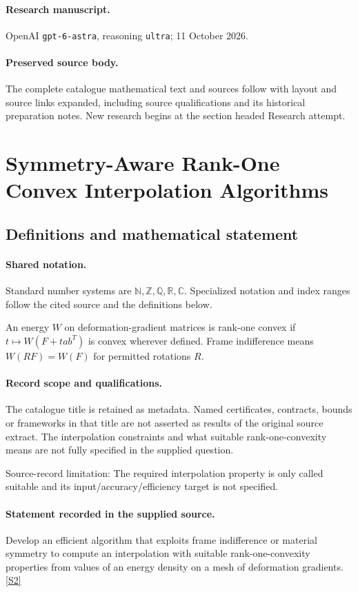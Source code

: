 \documentclass[11pt]{article}
\begin{document}
\paragraph{Research manuscript.} OpenAI \texttt{gpt-6-astra}, reasoning \texttt{ultra}; 11 October 2026.
\paragraph{Preserved source body.} The complete catalogue mathematical text and sources follow with layout and source links expanded, including source qualifications and its historical preparation notes. New research begins at the section headed Research attempt.

\section{Symmetry-Aware Rank-One Convex Interpolation Algorithms}\label{statement}

\subsection{Definitions and mathematical statement}

\paragraph{Shared notation.}Standard number systems are $\mathbb N,\mathbb Z,\mathbb Q,\mathbb R,\mathbb C$. Specialized notation and index ranges follow the cited source and the definitions below.


An energy $W$ on deformation-gradient matrices is rank-one convex if $t\mapsto W(F+t ab^T)$ is convex wherever defined. Frame indifference means $W(RF)=W(F)$ for permitted rotations $R$.
\paragraph{Record scope and qualifications.}
The catalogue title is retained as metadata. Named certificates, contracts, bounds or frameworks in that title are not asserted as results of the original source extract.
The interpolation constraints and what suitable rank-one-convexity means are not fully specified in the supplied question.

Source-record limitation: The required interpolation property is only called suitable and its input/accuracy/efficiency target is not specified.
\paragraph{Statement recorded in the supplied source.}
Develop an efficient algorithm that exploits frame indifference or material symmetry to compute an interpolation with suitable rank-one-convexity properties from values of an energy density on a mesh of deformation gradients. \href{https://doi.org/10.4171/owr/2005/52}{[S2]}
\end{document}
